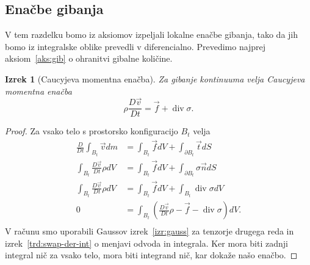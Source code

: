 \documentclass[12pt,a4paper,twoside]{article}
\theoremstyle{definition} %
\theoremstyle{plain} %
\newtheorem{izrek}[definicija]{Izrek}
\numberwithin{equation}{section}
\renewcommand{\div}{\operatorname{div}}
\newcommand{\DD}[2]{\ensuremath{\frac{D #1}{D #2}}}
\newcommand{\DDt}[1]{\DD{#1}{t}}
\newcommand{\vv}{\vec{v}}
\newcommand{\vt}{\vec{t}}
\newcommand{\vn}{\vec{n}}
\newcommand{\vf}{\vec{f}}
\newcommand{\ts}{\sigma}
\begin{document}
\subsection{Enačbe gibanja}
V tem razdelku bomo iz aksiomov izpeljali lokalne enačbe gibanja, tako da jih
bomo iz integralske oblike prevedli v diferencialno.
Prevedimo najprej aksiom~\ref{aks:gib} o ohranitvi gibalne količine.
\begin{izrek}[Caucyjeva momentna enačba]
  Za gibanje kontinuuma velja Caucyjeva momentna enačba
  \begin{equation}
    \rho \DDt{\vv} = \vf + \div \sigma.
    \label{eq:cauchy-moment}
  \end{equation}
\end{izrek}
\begin{proof}
Za vsako telo s prostorsko konfiguracijo $B_t$ velja
\begin{align*}
  \DDt{} \int_{B_t} \vv dm &= \int_{B_t} \vf dV + \int_{\partial {B_t}} \vt dS \\
  \int_{B_t} \DDt{\vv}\rho dV &= \int_{B_t} \vf dV + \int_{\partial {B_t}} \ts \vn dS \\
  \int_{B_t} \DDt{\vv}\rho dV &= \int_{B_t} \vf dV + \int_{B_t} \div \ts dV \\
  0 &= \int_{B_t}\left(\DDt{\vv}\rho - \vf - \div \ts\right) dV. \\
\end{align*}
V računu smo uporabili Gaussov izrek~\ref{izr:gauss} za tenzorje drugega reda in
izrek~\ref{trd:swap-der-int} o menjavi odvoda in integrala. Ker mora biti zadnji
integral nič za vsako telo, mora biti integrand nič, kar dokaže našo enačbo.
\end{proof}
\end{document}

